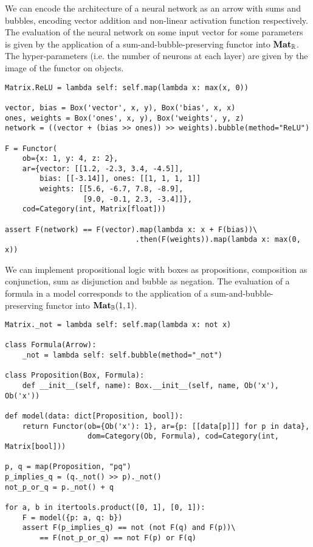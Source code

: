 \begin{example}\label{example:neural-net}
We can encode the architecture of a neural network as an arrow with sums and bubbles, encoding vector addition and non-linear activation function respectively.
The evaluation of the neural network on some input vector for some parameters is given by the application of a sum-and-bubble-preserving functor into $\mathbf{Mat}_{\mathbb{R}}$.
The hyper-parameters (i.e. the number of neurons at each layer) are given by the image of the functor on objects.

\begin{verbatim}
Matrix.ReLU = lambda self: self.map(lambda x: max(x, 0))

vector, bias = Box('vector', x, y), Box('bias', x, x)
ones, weights = Box('ones', x, y), Box('weights', y, z)
network = ((vector + (bias >> ones)) >> weights).bubble(method="ReLU")

F = Functor(
    ob={x: 1, y: 4, z: 2},
    ar={vector: [[1.2, -2.3, 3.4, -4.5]],
        bias: [[-3.14]], ones: [[1, 1, 1, 1]]
        weights: [[5.6, -6.7, 7.8, -8.9],
                  [9.0, -0.1, 2.3, -3.4]]},
    cod=Category(int, Matrix[float]))

assert F(network) == F(vector).map(lambda x: x + F(bias))\
                              .then(F(weights)).map(lambda x: max(0, x))
\end{verbatim}
\end{example}

\begin{example}\label{example:propositional-logic}
We can implement propositional logic with boxes as propositions, composition as conjunction, sum as disjunction and bubble as negation.
The evaluation of a formula in a model corresponds to the application of a sum-and-bubble-preserving functor into $\mathbf{Mat}_{\mathbb{B}}(1, 1)$.

\begin{verbatim}
Matrix._not = lambda self: self.map(lambda x: not x)

class Formula(Arrow):
    _not = lambda self: self.bubble(method="_not")

class Proposition(Box, Formula):
    def __init__(self, name): Box.__init__(self, name, Ob('x'), Ob('x'))

def model(data: dict[Proposition, bool]):
    return Functor(ob={Ob('x'): 1}, ar={p: [[data[p]]] for p in data},
                   dom=Category(Ob, Formula), cod=Category(int, Matrix[bool]))

p, q = map(Proposition, "pq")
p_implies_q = (q._not() >> p)._not()
not_p_or_q = p._not() + q

for a, b in itertools.product([0, 1], [0, 1]):
    F = model({p: a, q: b})
    assert F(p_implies_q) == not (not F(q) and F(p))\
        == F(not_p_or_q) == not F(p) or F(q)
\end{verbatim}
\end{example}

